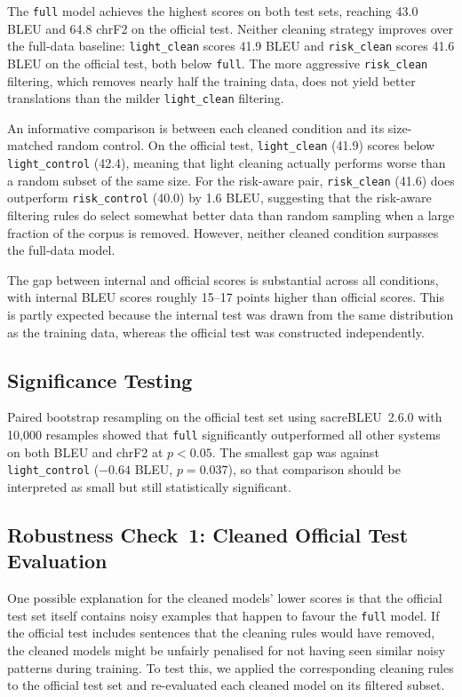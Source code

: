 \documentclass[11pt]{article}
\begin{document}
The \texttt{full} model achieves the highest scores on both test sets, reaching 43.0 BLEU and 64.8 chrF2 on the official test. Neither cleaning strategy improves over the full-data baseline: \texttt{light\_clean} scores 41.9 BLEU and \texttt{risk\_clean} scores 41.6 BLEU on the official test, both below \texttt{full}. The more aggressive \texttt{risk\_clean} filtering, which removes nearly half the training data, does not yield better translations than the milder \texttt{light\_clean} filtering.

An informative comparison is between each cleaned condition and its size-matched random control. On the official test, \texttt{light\_clean} (41.9) scores below \texttt{light\_control} (42.4), meaning that light cleaning actually performs worse than a random subset of the same size. For the risk-aware pair, \texttt{risk\_clean} (41.6) does outperform \texttt{risk\_control} (40.0) by 1.6 BLEU, suggesting that the risk-aware filtering rules do select somewhat better data than random sampling when a large fraction of the corpus is removed. However, neither cleaned condition surpasses the full-data model.

The gap between internal and official scores is substantial across all conditions, with internal BLEU scores roughly 15--17 points higher than official scores. This is partly expected because the internal test was drawn from the same distribution as the training data, whereas the official test was constructed independently.

\subsection{Significance Testing}

Paired bootstrap resampling on the official test set using sacreBLEU~2.6.0 with 10,000 resamples showed that \texttt{full} significantly outperformed all other systems on both BLEU and chrF2 at $p < 0.05$. The smallest gap was against \texttt{light\_control} ($-0.64$ BLEU, $p = 0.037$), so that comparison should be interpreted as small but still statistically significant.

\subsection{Robustness Check~1: Cleaned Official Test Evaluation}
\label{sec:cleaned-test}

One possible explanation for the cleaned models' lower scores is that the official test set itself contains noisy examples that happen to favour the \texttt{full} model. If the official test includes sentences that the cleaning rules would have removed, the cleaned models might be unfairly penalised for not having seen similar noisy patterns during training. To test this, we applied the corresponding cleaning rules to the official test set and re-evaluated each cleaned model on its filtered subset.
\end{document}

